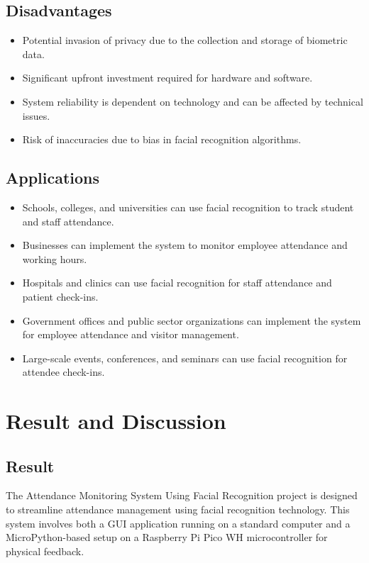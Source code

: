 \documentclass[12pt,a4paper]{report}
\begin{document}
\section{Disadvantages}
\begin{itemize}
	\item Potential invasion of privacy due to the collection and storage of biometric data.
	\item Significant upfront investment required for hardware and software.
	\item System reliability is dependent on technology and can be affected by technical issues.
	\item Risk of inaccuracies due to bias in facial recognition algorithms.
\end{itemize}

\section{Applications}
\begin{itemize}
	\item Schools, colleges, and universities can use facial recognition to track student and staff attendance.
	\item Businesses can implement the system to monitor employee attendance and working hours.
	\item Hospitals and clinics can use facial recognition for staff attendance and patient check-ins.
	\item Government offices and public sector organizations can implement the system for employee attendance and visitor management.
	\item Large-scale events, conferences, and seminars can use facial recognition for attendee check-ins.
\end{itemize}

\chapter{Result and Discussion}
\section{Result}
\par The Attendance Monitoring System Using Facial Recognition project is designed to streamline attendance management using facial recognition technology. This system involves both a GUI application running on a standard computer and a MicroPython-based setup on a Raspberry Pi Pico WH microcontroller for physical feedback.
\end{document}
